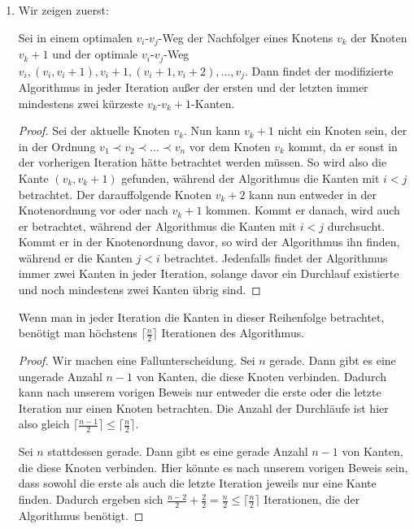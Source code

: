 \documentclass{scrartcl} %
\begin{document}
\begin{aufgabe}
\begin{enumerate}[label=(\alph*)]
\begin{enumerate}[label=(\roman*)]
            \end{enumerate}
            \item Wir zeigen zuerst:
                \begin{theorem*}
                    Sei in einem optimalen $v_i$-$v_j$-Weg der Nachfolger eines Knotens $v_k$ der Knoten $v_k + 1$ und der optimale $v_i$-$v_j$-Weg $v_i, (v_i, v_i + 1), v_i + 1, (v_i + 1, v_i + 2), \ldots, v_j$. Dann findet der modifizierte Algorithmus in jeder Iteration außer der ersten und der letzten immer mindestens zwei kürzeste $v_k$-$v_k + 1$-Kanten.
                \end{theorem*}
                \begin{proof}
                    Sei der aktuelle Knoten $v_k$. Nun kann $v_k + 1$ nicht ein Knoten sein, der in der Ordnung $v_1 \prec v_2 \prec \ldots \prec v_n$ vor dem Knoten $v_k$ kommt, da er sonst in der vorherigen Iteration hätte betrachtet werden müssen. So wird also die Kante $(v_k, v_k + 1)$ gefunden, während der Algorithmus die Kanten mit $i < j$ betrachtet. Der darauffolgende Knoten $v_k + 2$ kann nun entweder in der Knotenordnung vor oder nach $v_k + 1$ kommen. Kommt er danach, wird auch er betrachtet, während der Algorithmus die Kanten mit $i < j$ durchsucht. Kommt er in der Knotenordnung davor, so wird der Algorithmus ihn finden, während er die Kanten $j < i$ betrachtet. Jedenfalls findet der Algorithmus immer zwei Kanten in jeder Iteration, solange davor ein Durchlauf existierte und noch mindestens zwei Kanten übrig sind.
                \end{proof}
                \begin{theorem*}
                    Wenn man in jeder Iteration die Kanten in dieser Reihenfolge betrachtet, benötigt man höchstens $\lceil \frac{n}{2} \rceil$ Iterationen des Algorithmus.
                \end{theorem*}
                \begin{proof}
                    Wir machen eine Fallunterscheidung. Sei $n$ gerade. Dann gibt es eine ungerade Anzahl $n - 1$ von Kanten, die diese Knoten verbinden. Dadurch kann nach unserem vorigen Beweis nur entweder die erste oder die letzte Iteration nur einen Knoten betrachten. Die Anzahl der Durchläufe ist hier also gleich $\lceil \frac{n - 1}{2}\rceil \leq \lceil \frac{n}{2}\rceil$.

                    Sei $n$ stattdessen gerade. Dann gibt es eine gerade Anzahl $n - 1$ von Kanten, die diese Knoten verbinden. Hier könnte es nach unserem vorigen Beweis sein, dass sowohl die erste als auch die letzte Iteration jeweils nur eine Kante finden. Dadurch ergeben sich $\frac{n - 2}{2} + \frac{2}{2} = \frac{n}{2} \leq \lceil \frac{n}{2}\rceil$ Iterationen, die der Algorithmus benötigt.
                \end{proof}
        \end{enumerate}
    \end{aufgabe}
\end{document}
